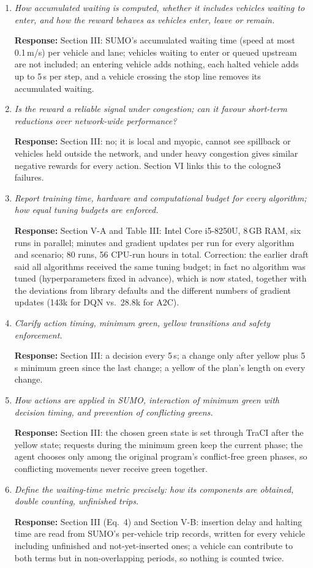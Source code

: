 \documentclass[11pt,a4paper]{article}
\newcommand{\cm}[2]{\item[\textbf{#1.}] \textit{#2}\par}
\newcommand{\re}{\par\textbf{Response:} }
\begin{document}
\begin{enumerate}[leftmargin=*, label={}, itemsep=6pt]
\cm{35}{How accumulated waiting is computed, whether it includes vehicles waiting to enter, and how the reward behaves as vehicles enter, leave or remain.}
\re Section III: SUMO's accumulated waiting time (speed at most 0.1\,m/s) per vehicle and lane; vehicles waiting to enter or queued upstream are not included; an entering vehicle adds nothing, each halted vehicle adds up to 5\,s per step, and a vehicle crossing the stop line removes its accumulated waiting.

\cm{36}{Is the reward a reliable signal under congestion; can it favour short-term reductions over network-wide performance?}
\re Section III: no; it is local and myopic, cannot see spillback or vehicles held outside the network, and under heavy congestion gives similar negative rewards for every action. Section VI links this to the cologne3 failures.

\cm{37}{Report training time, hardware and computational budget for every algorithm; how equal tuning budgets are enforced.}
\re Section V-A and Table III: Intel Core i5-8250U, 8\,GB RAM, six runs in parallel; minutes and gradient updates per run for every algorithm and scenario; 80 runs, 56 CPU-run hours in total. Correction: the earlier draft said all algorithms received the same tuning budget; in fact no algorithm was tuned (hyperparameters fixed in advance), which is now stated, together with the deviations from library defaults and the different numbers of gradient updates (143k for DQN vs.\ 28.8k for A2C).

\cm{38}{Clarify action timing, minimum green, yellow transitions and safety enforcement.}
\re Section III: a decision every 5\,s; a change only after yellow plus 5\,s minimum green since the last change; a yellow of the plan's length on every change.

\cm{39}{How actions are applied in SUMO, interaction of minimum green with decision timing, and prevention of conflicting greens.}
\re Section III: the chosen green state is set through TraCI after the yellow state; requests during the minimum green keep the current phase; the agent chooses only among the original program's conflict-free green phases, so conflicting movements never receive green together.

\cm{40}{Define the waiting-time metric precisely: how its components are obtained, double counting, unfinished trips.}
\re Section III (Eq.~4) and Section V-B: insertion delay and halting time are read from SUMO's per-vehicle trip records, written for every vehicle including unfinished and not-yet-inserted ones; a vehicle can contribute to both terms but in non-overlapping periods, so nothing is counted twice.


\end{enumerate}
\end{document}
